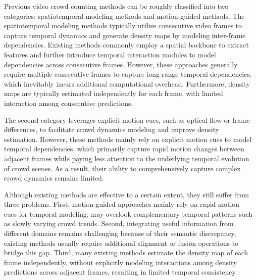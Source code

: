 \documentclass[lettersize,journal]{IEEEtran}
\begin{document}
Previous video crowd counting methods can be roughly classified into two categories: spatiotemporal modeling methods and motion-guided methods. The spatiotemporal modeling methods \cite{xiong2017spatiotemporal,zou2019enhanced,ma2021spatiotemporal,dong2022clrnet,cai2022global,wu2022spatial,ling2025dual,ling2026dual,ling2026cascaded} 
typically utilize consecutive video frames to capture temporal dynamics and generate density maps by modeling inter-frame dependencies.
Existing methods commonly employ a spatial backbone to extract features and further introduce temporal interaction modules to model dependencies across consecutive frames. However, these approaches generally require multiple consecutive frames to capture long-range temporal dependencies, which inevitably incurs additional computational overhead. Furthermore, density maps are typically estimated independently for each frame, with limited interaction among consecutive predictions.

The second category leverages explicit motion cues, such as optical flow\cite{ranjan2017optical,hossain2020video,hou2023frame,cao2024efficient} or frame differences\cite{ling2023motional}, to facilitate crowd dynamics modeling and improve density estimation. However, these methods mainly rely on explicit motion cues to model temporal dependencies, which primarily capture rapid motion changes between adjacent frames while paying less attention to the underlying temporal evolution of crowd scenes. As a result, their ability to comprehensively capture complex crowd dynamics remains limited.


Although existing methods are effective to a certain extent, they  still  suffer from three problems. First, motion-guided approaches mainly rely on rapid motion cues for temporal modeling, may overlook complementary temporal patterns such as slowly varying crowd trends. Second, integrating useful information from different domains remains challenging because of their semantic discrepancy, existing methods usually require additional alignment or fusion operations to bridge this gap. Third, many existing methods estimate the density map of each frame independently, without explicitly modeling interactions among density predictions across adjacent frames, resulting in limited temporal consistency.
\end{document}

